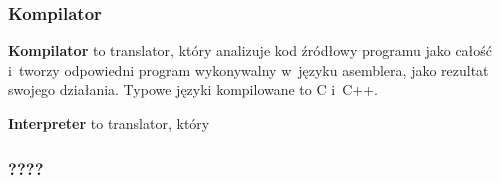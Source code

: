 \documentclass[10pt,t]{beamer}
\begin{document}
\begin{frame}
  \frametitle{Kompilator}


  \textbf{Kompilator} to translator, który analizuje kod źródłowy programu
  jako całość i~tworzy odpowiedni program wykonywalny w~języku asemblera,
  jako rezultat swojego działania. Typowe języki kompilowane to C i~C++.

  \textbf{Interpreter} to translator, który

\end{frame}





\begin{frame}
  \frametitle{????}




\end{frame}






















\end{document}
